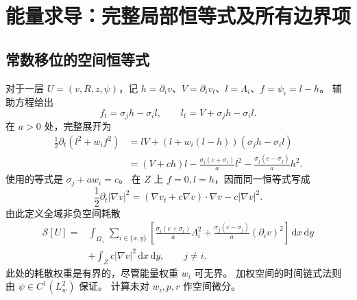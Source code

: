 \documentclass[UTF8,a4paper,11pt,fontset=none]{ctexart}
\numberwithin{equation}{section}
\theoremstyle{definition}
\theoremstyle{definition}
\newcommand{\Om}{\Omega}
\newcommand{\dd}{\,\mathrm d}
\newcommand{\Sc}{\mathscr S}
\begin{document}
\section{能量求导：完整局部恒等式及所有边界项}
\label{sec:identity}

\subsection{常数移位的空间恒等式}
对于一层 $U=(v,R,z,\psi)$，记 $h=\partial_i v$、$V=\partial_i v_t$、$l=\Lambda_i$、$f=\psi_i=l-h$。
辅助方程给出
\[
 f_t=\sigma_jh-\sigma_i l,\qquad l_t=V+\sigma_jh-\sigma_i l.
\]
在 $a>0$ 处，完整展开为
\begin{equation}\label{eq:spatialidentity}
\begin{aligned}
 \frac12\partial_t(l^2+w_if^2)
 &=lV+(l+w_i(l-h))(\sigma_jh-\sigma_i l)\\
 &=(V+ch)l-\frac{\sigma_i(c+\sigma_i)}a l^2
              -\frac{\sigma_j(c-\sigma_j)}a h^2.
\end{aligned}
\end{equation}
使用的等式是 $\sigma_j+aw_i=c$。
在 $Z$ 上 $f=0,l=h$，因而同一恒等式写成
\[
 \frac12\partial_t|\nabla v|^2
 =(\nabla v_t+c\nabla v)\cdot\nabla v-c|\nabla v|^2.
\]
由此定义全域非负空间耗散
\begin{equation}\label{eq:spatialdiss}
\begin{aligned}
 \Sc[U]={}&\int_{\Om_+}\sum_{i\in\{x,y\}}
 \left[\frac{\sigma_i(c+\sigma_i)}a\Lambda_i^2
       +\frac{\sigma_j(c-\sigma_j)}a(\partial_i v)^2\right]\dd x\dd y\\
 &+\int_Zc|\nabla v|^2\dd x\dd y,\qquad j\ne i.
\end{aligned}
\end{equation}
此处的耗散权重是有界的，尽管能量权重 $w_i$ 可无界。
加权空间的时间链式法则由 $\psi\in C^1(L_w^2)$ 保证。
计算未对 $w_i,p,r$ 作空间微分。
\end{document}
